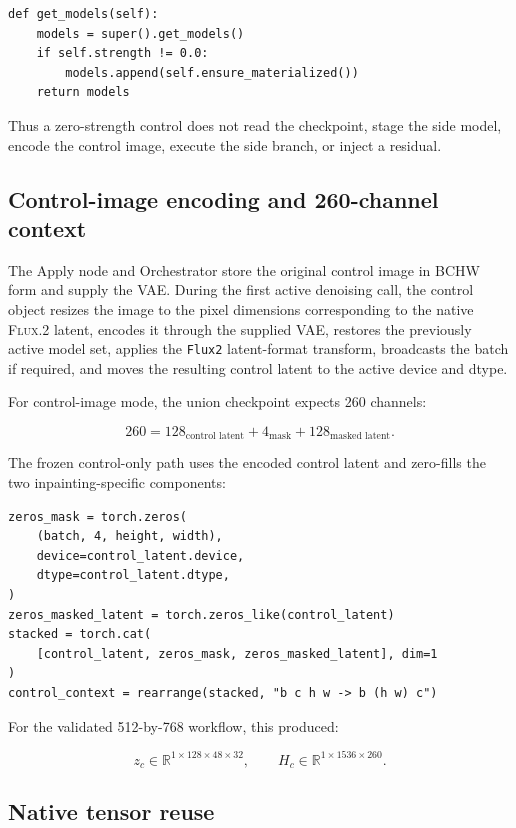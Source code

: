 \documentclass[11pt]{article}
\newcommand{\FluxTwo}{\textsc{Flux.2}}
\newcommand{\code}[1]{\texttt{#1}}
\begin{document}
\begin{lstlisting}[style=pythonstyle,caption={Exact zero-strength bypass during model discovery.}]
def get_models(self):
    models = super().get_models()
    if self.strength != 0.0:
        models.append(self.ensure_materialized())
    return models
\end{lstlisting}

Thus a zero-strength control does not read the checkpoint, stage the side model, encode the control image, execute the side branch, or inject a residual.

\subsection{Control-image encoding and 260-channel context}

The Apply node and Orchestrator store the original control image in BCHW form and supply the VAE. During the first active denoising call, the control object resizes the image to the pixel dimensions corresponding to the native \FluxTwo{} latent, encodes it through the supplied VAE, restores the previously active model set, applies the \code{Flux2} latent-format transform, broadcasts the batch if required, and moves the resulting control latent to the active device and dtype.

For control-image mode, the union checkpoint expects 260 channels:

\[
  260 = 128_{\text{control latent}} + 4_{\text{mask}} + 128_{\text{masked latent}}.
\]

The frozen control-only path uses the encoded control latent and zero-fills the two inpainting-specific components:

\begin{lstlisting}[style=pythonstyle,caption={Control-only 260-channel context.}]
zeros_mask = torch.zeros(
    (batch, 4, height, width),
    device=control_latent.device,
    dtype=control_latent.dtype,
)
zeros_masked_latent = torch.zeros_like(control_latent)
stacked = torch.cat(
    [control_latent, zeros_mask, zeros_masked_latent], dim=1
)
control_context = rearrange(stacked, "b c h w -> b (h w) c")
\end{lstlisting}

For the validated 512-by-768 workflow, this produced:

\[
  z_c \in \mathbb{R}^{1\times128\times48\times32},
  \qquad
  H_c \in \mathbb{R}^{1\times1536\times260}.
\]

\subsection{Native tensor reuse}
\end{document}
